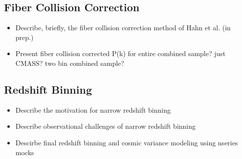 \documentclass{article}
\begin{document}
\subsection{Fiber Collision Correction}
\begin{itemize}
\item Describe, briefly, the fiber collision correction method of Hahn et al. (in prep.) 
\item Present fiber collision corrected P(k) for entire combined sample? just CMASS? two bin combined sample? 
\end{itemize}

\subsection{Redshift Binning} 
\begin{itemize}
\item Describe the motivation for narrow redshift binning 
\item Describe observational challenges of narrow redshift binning
\item Descirbe final redshift binning and cosmic variance modeling using nseries mocks 
\end{itemize}
\end{document}
